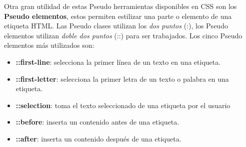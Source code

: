 Otra gran utilidad de estas Pseudo herramientas disponibles en CSS son los \textbf{Pseudo elementos}, estos permiten estilizar una parte o elemento de una etiqueta HTML. Las Pseudo clases utilizan los \textit{dos puntos} (:), los Pseudo elementos utilizan \textit{doble dos puntos} (::) para ser trabajados. Los cinco Pseudo elementos más utilizados son:
\begin{itemize}
    \item \textbf{::first-line}: selecciona la primer línea de un texto en una etiqueta.
    \item \textbf{::first-letter}: selecciona la primer letra de un texto o palabra en una etiqueta.
    \item \textbf{::selection}: toma el texto seleccionado de una etiqueta por el usuario
    \item \textbf{::before}: inserta un contenido antes de una etiqueta.
    \item \textbf{::after}: inserta un contenido después de una etiqueta.
\end{itemize}

